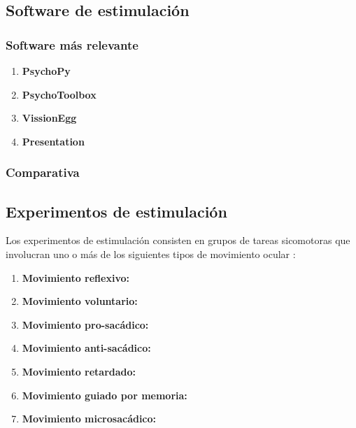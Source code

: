 \documentclass[../main.tex]{subfiles}
\begin{document}
		\subsection{Software de estimulación}
		\label{sub:02_software_de_estimulacion}
			\subsubsection{Software más relevante}
			\label{ssub:02_software_mas_relevante}
				\begin{enumerate}
					\item \textbf{PsychoPy}

					\item \textbf{PsychoToolbox}

					\item \textbf{VissionEgg}

					\item \textbf{Presentation}

				\end{enumerate}

			\subsubsection{Comparativa}
			\label{ssub:02_comparativa_software}

		\subsection{Experimentos de estimulación}
		\label{sub:02_experimentos_de_estimulacion}

		Los experimentos de estimulación consisten en grupos de tareas sicomotoras que involucran uno o más de los siguientes tipos de movimiento ocular \cite{website:movOcular}: 
		\begin{enumerate}
		 	\item \textbf{Movimiento reflexivo:}

		 	\item \textbf{Movimiento voluntario:}
		 	
		 	\item \textbf{Movimiento pro-sacádico:}
		 	
		 	\item \textbf{Movimiento anti-sacádico:}

		 	\item \textbf{Movimiento retardado:}

		 	\item \textbf{Movimiento guiado por memoria:}

		 	\item \textbf{Movimiento microsacádico:}

		 \end{enumerate} 
\end{document}
